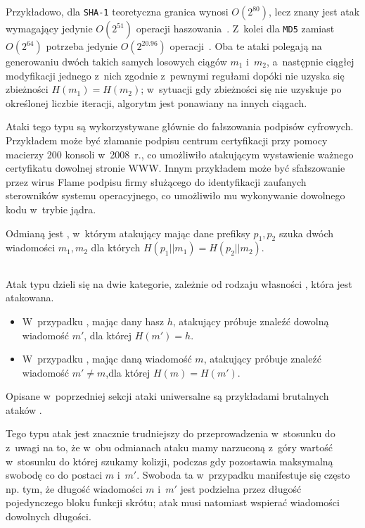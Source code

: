 Przykładowo, dla \texttt{SHA-1} teoretyczna granica wynosi $O(2^{80})$, lecz
znany jest atak wymagający jedynie $O(2^{51})$ operacji
haszowania~\cite{best_sha1_collision_attack}. Z~kolei dla \texttt{MD5} zamiast
$O(2^{64})$ potrzeba jedynie $O(2^{20.96})$
operacji~\cite{best_md5_collision_attack}. Oba te ataki polegają na generowaniu
dwóch takich samych losowych ciągów $m_1$ i~$m_2$, a~następnie ciągłej
modyfikacji jednego z~nich zgodnie z~pewnymi regułami dopóki nie uzyska się
zbieżności $H(m_1) = H(m_2)$; w~sytuacji gdy zbieżności się nie uzyskuje po
określonej liczbie iteracji, algorytm jest ponawiany na innych ciągach.

Ataki tego typu są wykorzystywane głównie do fałszowania podpisów cyfrowych.
Przykładem może być złamanie podpisu centrum certyfikacji przy pomocy macierzy
200 konsoli  w~2008~r.\cite{ps3_attack}, co umożliwiło
atakującym wystawienie ważnego certyfikatu dowolnej stronie WWW. Innym
przykładem może być sfałszowanie przez wirus Flame podpisu firmy
 służącego do identyfikacji zaufanych sterowników systemu
operacyjnego\cite{flame_attack}, co umożliwiło mu wykonywanie dowolnego kodu
w~trybie jądra.

Odmianą  jest ,
w~którym atakujący mając dane prefiksy $p_1, p_2$ szuka dwóch wiadomości $m_1,
m_2$ dla których $H(p_1 || m_1) = H(p_2 || m_2)$.


\subsection{}
Atak typu  dzieli się na dwie kategorie, zależnie od rodzaju
własności , która jest atakowana.
    \begin{itemize}

    \item W~przypadku , mając dany hasz $h$, atakujący
    próbuje znaleźć dowolną wiadomość $m'$, dla której $H(m') = h$.

    \item W~przypadku , mając daną wiadomość $m$,
    atakujący próbuje znaleźć wiadomość $m' \neq m$,dla której $H(m) = H(m')$.

    \end{itemize}
Opisane w~poprzedniej sekcji ataki uniwersalne są przykładami
brutalnych ataków .

Tego typu atak jest znacznie trudniejszy do przeprowadzenia w~stosunku do
 z~uwagi na to, że w~obu odmianach ataku mamy narzuconą
z~góry wartość w~stosunku do której szukamy kolizji, podczas gdy  pozostawia maksymalną swobodę co do postaci $m$ i~$m'$. Swoboda ta
w~przypadku  manifestuje się często np. tym, że długość
wiadomości $m$ i~$m'$ jest podzielna przez długość pojedynczego bloku funkcji
skrótu; atak  musi natomiast wspierać wiadomości dowolnych
długości.

